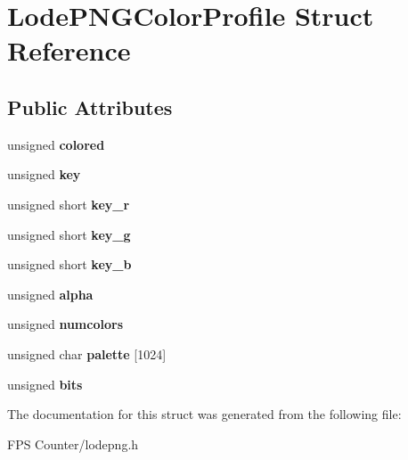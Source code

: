 \hypertarget{struct_lode_p_n_g_color_profile}{}\section{Lode\+P\+N\+G\+Color\+Profile Struct Reference}
\label{struct_lode_p_n_g_color_profile}
\subsection*{Public Attributes}
\begin{DoxyCompactItemize}
\item 
\mbox{\label{struct_lode_p_n_g_color_profile_abf063a566a4ab9f4d71b49764573d610}} 
unsigned {\bfseries colored}
\item 
\mbox{\label{struct_lode_p_n_g_color_profile_a24f19f400a53672340877eefbc837b0c}} 
unsigned {\bfseries key}
\item 
\mbox{\label{struct_lode_p_n_g_color_profile_a0398985ae0572ef97e83c33c7486cafd}} 
unsigned short {\bfseries key\+\_\+r}
\item 
\mbox{\label{struct_lode_p_n_g_color_profile_aba03e973374bd15315b8c01b86e94e8f}} 
unsigned short {\bfseries key\+\_\+g}
\item 
\mbox{\label{struct_lode_p_n_g_color_profile_a39b65ec69f6aaee3ee7312a993f21e40}} 
unsigned short {\bfseries key\+\_\+b}
\item 
\mbox{\label{struct_lode_p_n_g_color_profile_a554fea329af8034e91e1cdd8c1af0d90}} 
unsigned {\bfseries alpha}
\item 
\mbox{\label{struct_lode_p_n_g_color_profile_afdce0f5fbec46d6b8f1ec63da0a285f9}} 
unsigned {\bfseries numcolors}
\item 
\mbox{\label{struct_lode_p_n_g_color_profile_a223f8bee4c9ae8be0b70cc08f19aaead}} 
unsigned char {\bfseries palette} \mbox{[}1024\mbox{]}
\item 
\mbox{\label{struct_lode_p_n_g_color_profile_a1d3870b03dfe6d699bf4c968c9bc1890}} 
unsigned {\bfseries bits}
\end{DoxyCompactItemize}


The documentation for this struct was generated from the following file\+:\begin{DoxyCompactItemize}
\item 
F\+P\+S Counter/lodepng.\+h\end{DoxyCompactItemize}
